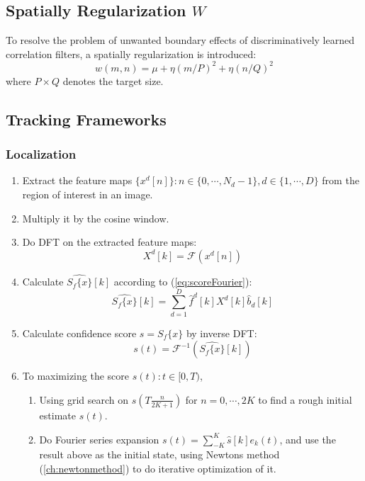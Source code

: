 \documentclass[12pt]{article}
\numberwithin{equation}{section}
\begin{document}
\subsection{Spatially Regularization $W$ \cite{danelljan2015learning}}
To resolve the problem of unwanted boundary effects of discriminatively learned correlation filters, a spatially regularization is introduced:
\begin{equation}
	w(m, n) = \mu + \eta(m/P)^2 + \eta(n/Q)^2
\end{equation}
where $P \times Q$ denotes the target size. \par
\subsection{Tracking Frameworks}
\subsubsection{Localization}
\begin{enumerate}
	\item Extract the feature maps $\{x^d[n]\}: n \in \{0, \cdots, N_d -1\}, d \in \{1, \cdots, D\}$ from the region of interest in an image.
	\item Multiply it by the cosine window.
	\item Do DFT on the extracted feature maps:
		\begin{equation} 
			X^d[k] = \mathcal{F} (x^d[n])
		\end{equation} \par	
	\item Calculate $\widehat{S_f\{x\}}[k]$ according to (\ref{eq:scoreFourier}):
		\begin{equation} 
			\widehat{S_f\{x\}}[k]=\sum^D_{d=1} \hat{f}^d[k] X^d[k] \hat{b}_d[k]
		\end{equation} \par
	\item Calculate confidence score $s=S_f\{x\}$ by inverse DFT:
		\begin{equation} 
			s(t)=\mathcal{F}^{-1}(\widehat{S_f\{x\}}[k])
		\end{equation} \par
	\item To maximizing the score $s(t): t\in [0,T)$,
		\begin{enumerate}
			\item Using grid search on $s(T\frac{n}{2K+1})$ for $n=0, \cdots, 2K$ to find a rough
			 initial estimate $s(t)$.
			\item Do Fourier series expansion $s(t)=\sum^K_{-K}\hat{s}[k]e_k(t)$, and use the result above
			as the initial state, using Newtons method (\ref{ch:newtonmethod}) to do iterative optimization of it.
		\end{enumerate}
\end{enumerate}
\end{document}
